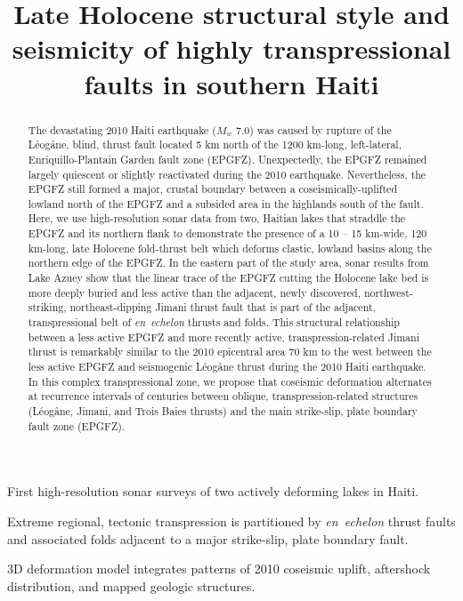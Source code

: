 \documentclass[linenumbers,draft]{agujournal}
\begin{document}
\title{Late Holocene structural style and seismicity of highly transpressional faults in southern Haiti}



\begin{keypoints}
\item First high-resolution sonar surveys of two actively deforming lakes in Haiti.
\item Extreme regional, tectonic transpression is partitioned by \textit{en~echelon} thrust faults and associated folds adjacent to a major strike-slip, plate boundary fault.
\item 3D deformation model integrates patterns of 2010 coseismic uplift, aftershock distribution, and mapped geologic structures.
\end{keypoints}

\begin{abstract}
The devastating 2010 Haiti earthquake ($M_w$ 7.0) was caused by rupture of the L\'eog\^ane, blind, thrust fault located 5 km north of the 1200 km-long, left-lateral, Enriquillo-Plantain Garden fault zone (EPGFZ). Unexpectedly, the EPGFZ remained largely quiescent or slightly reactivated during the 2010 earthquake. Nevertheless, the EPGFZ still formed a major, crustal boundary between a coseismically-uplifted lowland north of the EPGFZ and a subsided area in the highlands south of the fault. Here, we use high-resolution sonar data from two, Haitian lakes that straddle the EPGFZ and its northern flank to demonstrate the presence of a 10 -- 15 km-wide, 120 km-long, late Holocene fold-thrust belt which deforms clastic, lowland basins along the northern edge of the EPGFZ. In the eastern part of the study area, sonar results from Lake Azuey show that the linear trace of the EPGFZ cutting the Holocene lake bed is more deeply buried and less active than the adjacent, newly discovered, northwest-striking, northeast-dipping Jimani thrust fault that is part of the adjacent, transpressional belt of \textit{en~echelon} thrusts and folds. This structural relationship between a less active EPGFZ and more recently active, transpression-related Jimani thrust is remarkably similar to the 2010 epicentral area 70 km to the west between the less active EPGFZ and seismogenic L\'eog\^ane thrust during the 2010 Haiti earthquake. In this complex transpressional zone, we propose that coseismic deformation alternates at recurrence intervals of centuries between oblique, transpression-related structures (L\'eog\^ane, Jimani, and Trois Baies thrusts) and the main strike-slip, plate boundary fault zone (EPGFZ).
\end{abstract}
\end{document}
